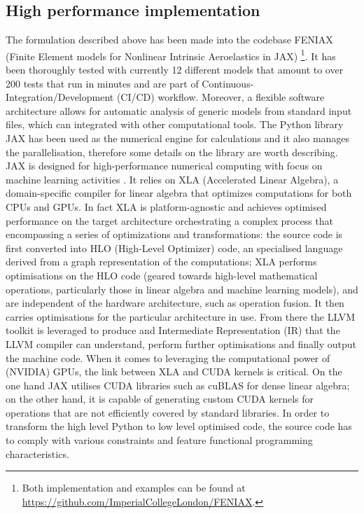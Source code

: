 \documentclass[11pt]{article}
\begin{document}
\subsection{High performance implementation}
\label{sec:org4d4d0f1}
The formulation described above has been made into the codebase FENIAX (Finite Element models for Nonlinear Intrinsic Aeroelastics in JAX) \footnote{Both implementation and examples can be found at \url{https://github.com/ImperialCollegeLondon/FENIAX}.}. It has been thoroughly tested with currently 12 different models that amount to over 200 tests that run in minutes and are part of Continuous-Integration/Development (CI/CD) workflow. Moreover, a flexible software architecture allows for automatic analysis of generic models from standard input files, which can integrated with other computational tools.
The Python library JAX has been used as the numerical engine for calculations and it also manages the parallelisation, therefore some details on the library are worth describing.
JAX is designed for high-performance numerical computing with focus on machine learning activities \cite{BRADBURY2018}. It relies on XLA (Accelerated Linear Algebra), a domain-specific compiler for linear algebra that optimizes computations for both CPUs and GPUs. In fact XLA is platform-agnostic and achieves optimised performance on the target architecture orchestrating a complex process that encompassing a series of optimizations and transformations: the source code is first converted into HLO (High-Level Optimizer) code, an specialised language derived from a graph representation of the computations; XLA performs optimisations on the HLO code (geared towards high-level mathematical operations, particularly those in linear algebra and machine learning models), and are independent of the hardware architecture, such as operation fusion. It then carries optimisations for the particular architecture in use. From there the LLVM toolkit is leveraged to produce and Intermediate Representation (IR) that the LLVM compiler can understand, perform further optimisations and finally output the machine code. 
When it comes to leveraging the computational power of (NVIDIA) GPUs, the link between XLA and CUDA kernels is critical. On the one hand JAX utilises CUDA libraries such as cuBLAS for dense linear algebra; on the other hand, it is capable of generating custom CUDA kernels for operations that are not efficiently covered by standard libraries. 
In order to transform the high level Python to low level optimised code, the source code has to comply with various constraints and feature functional programming characteristics.
\end{document}
